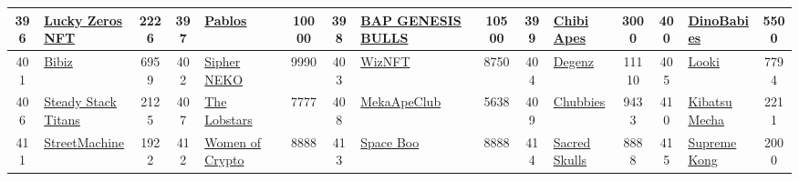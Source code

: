 \begin{table*}[]
{\begin{tabular}{|c|l|c|c|l|c|c|l|c|c|l|c|c|l|c|}
        396   & \href{http://luckyzeros.io}{Lucky Zeros NFT}                                       & 2226              & 397   & \href{https://pabloslol.net/}{Pablos}                                                             & 10000             & 398   & \href{https://www.bullsandapesproject.com}{BAP GENESIS BULLS}                     & 10500             & 399   & \href{https://chibilabs.io/}{Chibi Apes}                                      & 3000              & 400   & \href{https://www.dinobabies.io/}{DinoBabies}                                             & 5500                                    \\ \hline
        401   & \href{https://www.thehabibiz.io/}{Bibiz}                                           & 6959              & 402   & \href{https://sipher.xyz/}{Sipher NEKO}                                                           & 9990              & 403   & \href{https://opensea.io/collection/wzrds}{WizNFT}                                & 8750              & 404   & \href{https://www.degenz.co/}{Degenz}                                         & 11110             & 405   & \href{https://www.looki.games/}{Looki}                                                    & 7794                                    \\ \hline
        406   & \href{https://linktr.ee/steadystack}{Steady Stack Titans}                          & 2125              & 407   & \href{http://thelobstars.com}{The Lobstars}                                                       & 7777              & 408   & \href{http://meka-ape.com}{MekaApeClub}                                           & 5638              & 409   & \href{http://chubbies.io}{Chubbies}                                           & 9433              & 410   & \href{https://kibatsumecha.com}{Kibatsu Mecha}                                            & 2211                                    \\ \hline
        411   & \href{https://streetmachine.club}{StreetMachine}                                   & 1922              & 412   & \href{https://womenofcrypto.io/}{Women of Crypto}                                                 & 8888              & 413   & \href{https://spaceboo.io/}{Space Boo}                                            & 8888              & 414   & \href{https://www.sacredskullsnft.com/}{Sacred Skulls}                        & 8888              & 415   & \href{https://supremekong.com/}{Supreme Kong}                                             & 2000                                    \\ \hline

\end{tabular}}
\end{table*}

